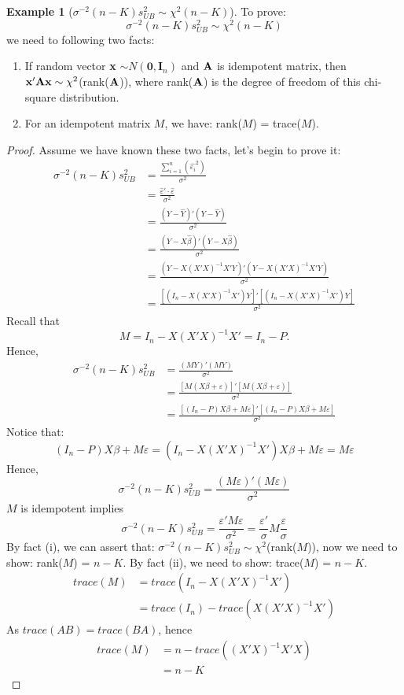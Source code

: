 \documentclass[12pt, a4paper]{article}
\theoremstyle{definition}
\newtheorem{example}{Example}
\newcommand{\vep}{\varepsilon}
\begin{document}
\begin{example}[$\sigma^{-2}(n-K)s_{UB}^2\sim\chi^2(n-K)$]
To prove: 
\[
\sigma^{-2}(n-K)s_{UB}^2\sim \chi^2(n-K)
\]
we need to following two facts:
\begin{enumerate}
\item If random vector \textbf{x} $\sim N(\textbf{0},\textbf{I}_n)$ and $\bold{A}$ is idempotent matrix, then $\bold{x'Ax}\sim \chi^2$(rank($\bold{A}$)), where rank($\bold{A}$) is the degree of freedom of this chi-square distribution.
\item For an idempotent matrix $M$, we have: rank($M$) = trace($M$).
\end{enumerate}
\begin{proof}
Assume we have known these two facts, let's begin to prove it:
\begin{align*}
\sigma^{-2}(n-K)s_{UB}^2 &= \frac{\sum\limits_{i=1}^n (\hat{\vep_i}^2)}{\sigma^2}\\
& = \frac{\hat{\vep}'\cdot \hat{\vep}}{\sigma^2} \\
& = \frac{(Y-\hat{Y})'(Y-\hat{Y})}{\sigma^2} \\
&= \frac{(Y-X\hat{\beta})'(Y-X\hat{\beta})}{\sigma^2}\\
&= \frac{(Y-X(X'X)^{-1}X'Y)'(Y-X(X'X)^{-1}X'Y)}{\sigma^2} \\
&= \frac{[(I_n-X(X'X)^{-1}X')Y]'[(I_n-X(X'X)^{-1}X')Y]}{\sigma^2} 
\end{align*}
Recall that
\[
M = I_n-X(X'X)^{-1}X' = I_n - P. 
\]
Hence, 
\begin{align*}
\sigma^{-2}(n-K)s_{UB}^2 &=\frac{(MY)'(MY)}{\sigma^2}\\
&= \frac{[M(X\beta +\vep)]'[M(X\beta +\vep)]}{\sigma^2}\\
&=\frac{[(I_n-P)X\beta + M\vep]'[(I_n-P)X\beta + M\vep]}{\sigma^2}
\end{align*}
Notice that: 
\[
(I_n-P)X\beta + M\vep = (I_n - X(X'X)^{-1}X')X\beta + M\vep=M\vep
\]
Hence, 
\[
\sigma^{-2}(n-K)s_{UB}^2 =\frac{(M\vep)'(M\vep)}{\sigma^2}
\]
$M$ is idempotent implies 
\[
\sigma^{-2}(n-K)s_{UB}^2 = \frac{\vep'M\vep}{\sigma^2} = \frac{\vep'}{\sigma}M\frac{\vep}{\sigma}
\]
By fact (i), we can assert that: $\sigma^{-2}(n-K)s_{UB}^2 \sim \chi^2$(rank($M$)), now we need to show: rank($M$) = $n-K$. By fact (ii), we need to show: trace($M$) = $n-K$.
\begin{align*}
trace(M) &= trace(I_n - X(X'X)^{-1}X')\\
&= trace(I_n) - trace(X(X'X)^{-1}X')
\end{align*}
As $trace(AB) = trace(BA)$, hence
\begin{align*}
trace(M)&= n-trace((X'X)^{-1}X'X)\\
&=n-K
\end{align*}
\end{proof}

\end{example}
\end{document}
